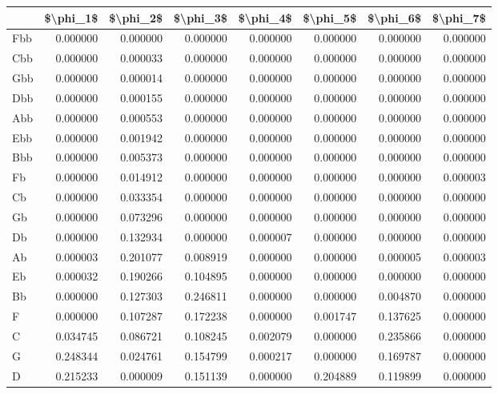 \begin{tabular}{lrrrrrrr}
\toprule
{} &  \$\textbackslash phi\_1\$ &  \$\textbackslash phi\_2\$ &  \$\textbackslash phi\_3\$ &  \$\textbackslash phi\_4\$ &  \$\textbackslash phi\_5\$ &  \$\textbackslash phi\_6\$ &  \$\textbackslash phi\_7\$ \\
\midrule
Fbb &  0.000000 &  0.000000 &  0.000000 &  0.000000 &  0.000000 &  0.000000 &  0.000000 \\
Cbb &  0.000000 &  0.000033 &  0.000000 &  0.000000 &  0.000000 &  0.000000 &  0.000000 \\
Gbb &  0.000000 &  0.000014 &  0.000000 &  0.000000 &  0.000000 &  0.000000 &  0.000000 \\
Dbb &  0.000000 &  0.000155 &  0.000000 &  0.000000 &  0.000000 &  0.000000 &  0.000000 \\
Abb &  0.000000 &  0.000553 &  0.000000 &  0.000000 &  0.000000 &  0.000000 &  0.000000 \\
Ebb &  0.000000 &  0.001942 &  0.000000 &  0.000000 &  0.000000 &  0.000000 &  0.000000 \\
Bbb &  0.000000 &  0.005373 &  0.000000 &  0.000000 &  0.000000 &  0.000000 &  0.000000 \\
Fb  &  0.000000 &  0.014912 &  0.000000 &  0.000000 &  0.000000 &  0.000000 &  0.000003 \\
Cb  &  0.000000 &  0.033354 &  0.000000 &  0.000000 &  0.000000 &  0.000000 &  0.000000 \\
Gb  &  0.000000 &  0.073296 &  0.000000 &  0.000000 &  0.000000 &  0.000000 &  0.000000 \\
Db  &  0.000000 &  0.132934 &  0.000000 &  0.000007 &  0.000000 &  0.000000 &  0.000000 \\
Ab  &  0.000003 &  0.201077 &  0.008919 &  0.000000 &  0.000000 &  0.000005 &  0.000003 \\
Eb  &  0.000032 &  0.190266 &  0.104895 &  0.000000 &  0.000000 &  0.000000 &  0.000000 \\
Bb  &  0.000000 &  0.127303 &  0.246811 &  0.000000 &  0.000000 &  0.004870 &  0.000000 \\
F   &  0.000000 &  0.107287 &  0.172238 &  0.000000 &  0.001747 &  0.137625 &  0.000000 \\
C   &  0.034745 &  0.086721 &  0.108245 &  0.002079 &  0.000000 &  0.235866 &  0.000000 \\
G   &  0.248344 &  0.024761 &  0.154799 &  0.000217 &  0.000000 &  0.169787 &  0.000000 \\
D   &  0.215233 &  0.000009 &  0.151139 &  0.000000 &  0.204889 &  0.119899 &  0.000000 \\

\end{tabular}

